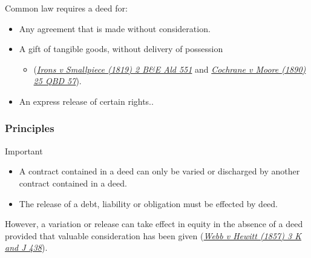 \documentclass[
]{article}
\providecommand{\tightlist}{%
  \setlength{\itemsep}{0pt}\setlength{\parskip}{0pt}}
\newenvironment{env-8890de02-1ba1-42c2-9b89-cb105d97c320}
{
    \savenotes\tcolorbox[blanker,breakable,left=5pt,borderline west={2pt}{-4pt}{cyan}]
}
{
    \endtcolorbox\spewnotes
}
\begin{document}
Common law requires a deed for:

\begin{itemize}
\tightlist
\item
  Any agreement that is made without consideration.
\item
  A gift of tangible goods, without delivery of possession

  \begin{itemize}
  \tightlist
  \item
    (\emph{\href{https://uk.practicallaw.thomsonreuters.com/D-016-1484?originationContext=document\&transitionType=PLDocumentLink\&contextData=(sc.Default)\&ppcid=0e69ecc7bd0b425c8c07be4517611bac}{Irons
    v Smallpiece (1819) 2 B\&E Ald 551}} and
    \emph{\href{https://uk.practicallaw.thomsonreuters.com/D-016-1485?originationContext=document\&transitionType=PLDocumentLink\&contextData=(sc.Default)\&ppcid=0e69ecc7bd0b425c8c07be4517611bac}{Cochrane
    v Moore (1890) 25 QBD 57}}).
  \end{itemize}
\item
  An express release of certain rights..
\end{itemize}

\hypertarget{principles}{%
\subsubsection{Principles}\label{principles}}

\begin{env-8890de02-1ba1-42c2-9b89-cb105d97c320}

Important

\begin{itemize}
\tightlist
\item
  A contract contained in a deed can only be varied or discharged by
  another contract contained in a deed.
\item
  The release of a debt, liability or obligation must be effected by
  deed.
\end{itemize}

\end{env-8890de02-1ba1-42c2-9b89-cb105d97c320}

However, a variation or release can take effect in equity in the absence
of a deed provided that valuable consideration has been given
(\emph{\href{https://uk.practicallaw.thomsonreuters.com/D-009-7407?originationContext=document\&transitionType=PLDocumentLink\&contextData=(sc.Default)\&ppcid=0e69ecc7bd0b425c8c07be4517611bac}{Webb
v Hewitt (1857) 3 K and J 438}}).
\end{document}
